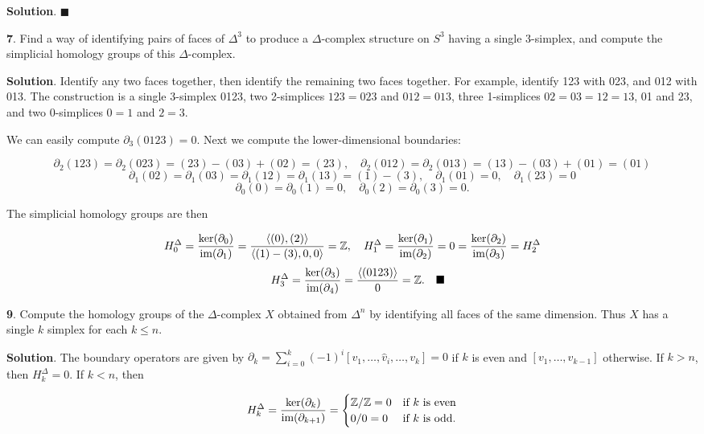 \documentclass{article}
\newcommand{\Z}{\mathbb{Z}}
\newcommand{\im}{\textnormal{im}}
\begin{document}
\textbf{Solution}. $\blacksquare$
\bigskip
\bigskip

\textbf{7}. Find a way of identifying pairs of faces of $\Delta^{3}$ to produce a $\Delta$-complex structure on $S^{3}$ having a single 3-simplex, and compute the simplicial homology groups of this $\Delta$-complex.
\medskip

\textbf{Solution}. Identify any two faces together, then identify the remaining two faces together. For example, identify 123 with 023, and 012 with 013. The construction is a single 3-simplex 0123, two 2-simplices $123 = 023$ and $012 = 013$, three 1-simplices $02 = 03 = 12 = 13$, 01 and 23, and two 0-simplices $0 = 1$ and $2 = 3$.
\medskip

We can easily compute $\partial_{3}(0123) = 0$. Next we compute the lower-dimensional boundaries:

$$\partial_{2} (123) = \partial_{2} (023) = (23)-(03)+(02) = (23),\quad \partial_{2} (012) = \partial_{2} (013) = (13)-(03)+(01) = (01)$$
$$\partial_{1}(02) = \partial_{1}(03) = \partial_{1}(12) = \partial_{1}(13) = (1) - (3),\quad \partial_{1}(01) = 0,\quad \partial_{1}(23) = 0$$
$$\partial_{0}(0) = \partial_{0}(1) = 0,\quad \partial_{0}(2) = \partial_{0}(3) = 0.$$

The simplicial homology groups are then

$$H^{\Delta}_{0} = \frac{\ker (\partial_{0})}{\im(\partial_{1})} = \frac{\langle (0), (2)\rangle}{\langle (1)-(3), 0, 0\rangle} = \Z,\quad H^{\Delta}_{1} = \frac{\ker (\partial_{1})}{\im(\partial_{2})} = 0 = \frac{\ker (\partial_{2})}{\im(\partial_{3})} = H^{\Delta}_{2}$$
$$\quad H^{\Delta}_{3} = \frac{\ker (\partial_{3})}{\im(\partial_{4})} = \frac{\langle (0123)\rangle}{0} = \Z.\quad \blacksquare$$
\bigskip

\textbf{9}. Compute the homology groups of the $\Delta$-complex $X$ obtained from $\Delta^{n}$ by identifying all faces of the same dimension. Thus $X$ has a single $k$ simplex for each $k\leq n$.
\medskip

\textbf{Solution}. The boundary operators are given by $\partial_{k} = \sum_{i=0}^{k} (-1)^{i} [v_{1},\ldots, \hat{v}_{i},\ldots, v_{k}] = 0$ if $k$ is even and $[v_{1},\ldots, v_{k-1}]$ otherwise. If $k > n$, then $H^{\Delta}_{k} = 0$. If $k < n$, then

$$H^{\Delta}_{k} = \frac{\ker (\partial_{k})}{\im(\partial_{k+1})} = \begin{cases}\Z/\Z = 0 & \textnormal{if $k$ is even}\\ 0/0 = 0 & \textnormal{if $k$ is odd}.\end{cases}$$
\end{document}
